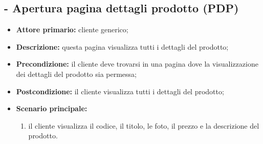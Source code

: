 \stepUserCase
\subsection{ - Apertura pagina dettagli prodotto (PDP)}
\begin{itemize}
    \item \textbf{Attore primario:} cliente generico;
    \item \textbf{Descrizione:} questa pagina visualizza tutti i dettagli del prodotto;
    \item \textbf{Precondizione:} il cliente deve trovarsi in una pagina dove la visualizzazione dei dettagli del prodotto sia permessa;
    \item \textbf{Postcondizione:} il cliente visualizza tutti i dettagli del prodotto;
    \item \textbf{Scenario principale:}
          \begin{enumerate}
              \item il cliente visualizza il codice, il titolo, le foto, il prezzo e la descrizione del prodotto.
          \end{enumerate}
\end{itemize}

\stepUserCase

